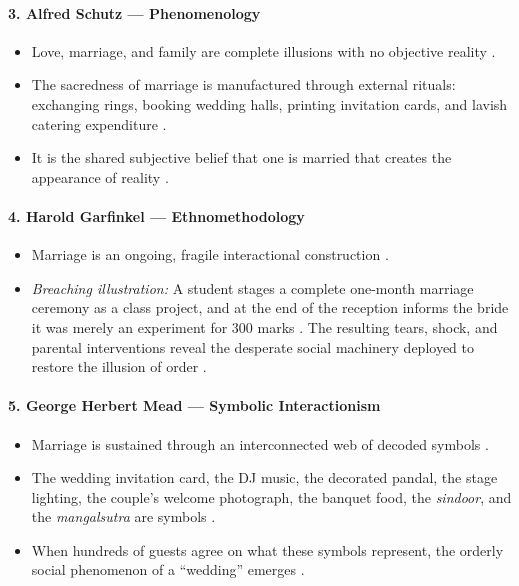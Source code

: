 \paragraph{3. Alfred Schutz --- Phenomenology}
\begin{itemize}
    \item Love, marriage, and family are complete illusions with no objective reality .
    \item The sacredness of marriage is manufactured through external rituals: exchanging rings, booking wedding halls, printing invitation cards, and lavish catering expenditure .
    \item It is the shared subjective belief that one is married that creates the appearance of reality .
\end{itemize}

\paragraph{4. Harold Garfinkel --- Ethnomethodology}
\begin{itemize}
    \item Marriage is an ongoing, fragile interactional construction .
    \item \textit{Breaching illustration:} A student stages a complete one-month marriage ceremony as a class project, and at the end of the reception informs the bride it was merely an experiment for 300 marks . The resulting tears, shock, and parental interventions reveal the desperate social machinery deployed to restore the illusion of order .
\end{itemize}

\paragraph{5. George Herbert Mead --- Symbolic Interactionism}
\begin{itemize}
    \item Marriage is sustained through an interconnected web of decoded symbols .
    \item The wedding invitation card, the DJ music, the decorated pandal, the stage lighting, the couple's welcome photograph, the banquet food, the \textit{sindoor}, and the \textit{mangalsutra} are symbols .
    \item When hundreds of guests agree on what these symbols represent, the orderly social phenomenon of a ``wedding'' emerges .
\end{itemize}

